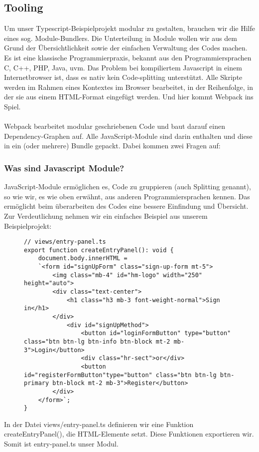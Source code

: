 \subsection{Tooling}

Um unser Typescript-Beispielprojekt modular zu gestalten, brauchen wir die Hilfe eines sog. \glqq Module-Bundlers\grqq{}. Die Unterteilung in Module wollen wir aus dem Grund der Übersichtlichkeit sowie der einfachen Verwaltung des Codes machen. Es ist eine klassische Programmierpraxis, bekannt aus den Programmiersprachen C, C++, PHP, Java, uvm. Das Problem bei kompiliertem Javascript in einem Internetbrowser ist, dass es nativ kein Code-splitting unterstützt. Alle Skripte werden im Rahmen eines Kontextes im Browser bearbeitet, in der Reihenfolge, in der sie aus einem HTML-Format eingefügt werden. Und hier kommt Webpack ins Spiel. \cite{webpack-einfuehrung}
\\\\
Webpack bearbeitet modular geschriebenen Code und baut darauf einen Dependency-Graphen auf. Alle JavaScript-Module sind darin enthalten und diese in ein (oder mehrere) Bundle gepackt. Dabei kommen zwei Fragen auf:

\subsubsection{Was sind Javascript Module?}
JavaScript-Module ermöglichen es, Code zu gruppieren (auch \glqq{}Splitting\grqq{} genannt), so wie wir, es wie oben erwähnt, aus anderen Programmiersprachen kennen. Das ermöglicht beim überarbeiten des Codes eine bessere Einfindung und Übersicht. Zur Verdeutlichung nehmen wir ein einfaches Beispiel aus unserem Beispielprojekt:


\begin{figure}[H]
\begin{lstlisting}
// views/entry-panel.ts
export function createEntryPanel(): void {
    document.body.innerHTML = 
    `<form id="signUpForm" class="sign-up-form mt-5">
        <img class="mb-4" id="hm-logo" width="250" height="auto">
        <div class="text-center">
            <h1 class="h3 mb-3 font-weight-normal">Sign in</h1>
        </div>
            <div id="signUpMethod">
                <button id="loginFormButton" type="button" class="btn btn-lg btn-info btn-block mt-2 mb-3">Login</button>
                <div class="hr-sect">or</div>
                <button id="registerFormButton"type="button" class="btn btn-lg btn-primary btn-block mt-2 mb-3">Register</button>
        </div>
    </form>`;
}
\end{lstlisting}
\end{figure}
In der Datei views/entry-panel.ts definieren wir eine Funktion createEntryPanel(), die HTML-Elemente setzt. Diese Funktionen exportieren wir. Somit ist entry-panel.ts unser Modul.

